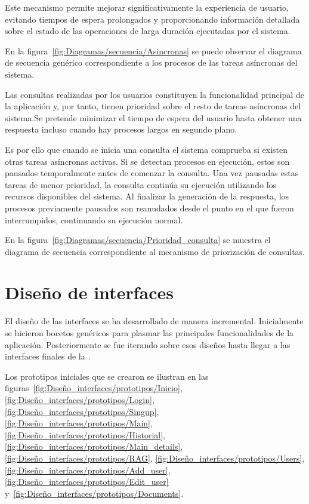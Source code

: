 Este mecanismo permite mejorar significativamente la experiencia de usuario, evitando tiempos de espera prolongados y proporcionando información detallada sobre el estado de las operaciones de larga duración ejecutadas por el sistema.

En la figura~\ref{fig:Diagramas/secuencia/Asincronas} se puede observar el diagrama de secuencia genérico correspondiente a los procesos de las tareas asíncronas del sistema.


Las consultas realizadas por los usuarios constituyen la funcionalidad principal de la aplicación y, por tanto, tienen prioridad sobre el resto de tareas asíncronas del sistema.Se pretende minimizar el tiempo de espera del usuario hasta obtener una respuesta incluso cuando hay procesos largos en segundo plano. 

Es por ello que cuando se inicia una consulta el sistema comprueba si existen otras tareas asíncronas activas. Si se detectan procesos en ejecución, estos son pausados temporalmente antes de comenzar la consulta. Una vez pausadas estas tareas de menor prioridad, la consulta continúa su ejecución utilizando los recursos disponibles del sistema. Al finalizar la generación de la respuesta, los procesos previamente pausados son reanudados desde el punto en el que fueron interrumpidos, continuando su ejecución normal.

En la figura~\ref{fig:Diagramas/secuencia/Prioridad_consulta} se muestra el diagrama de secuencia correspondiente al mecanismo de priorización de consultas.


\section{Diseño de interfaces} \label{dis:int}

El diseño de las interfaces se ha desarrollado de manera incremental. Inicialmente se hicieron bocetos genéricos para plasmar las principales funcionalidades de la aplicación. Posteriormente se fue iterando sobre esos diseños hasta llegar a las interfaces finales de la .

Los prototipos iniciales que se crearon se ilustran en las figuras~\ref{fig:Diseño_interfaces/prototipos/Inicio}, \ref{fig:Diseño_interfaces/prototipos/Login}, \ref{fig:Diseño_interfaces/prototipos/Singup}, \ref{fig:Diseño_interfaces/prototipos/Main}, \ref{fig:Diseño_interfaces/prototipos/Historial}, \ref{fig:Diseño_interfaces/prototipos/Main_details}, \ref{fig:Diseño_interfaces/prototipos/RAG}, \ref{fig:Diseño_interfaces/prototipos/Users}, \ref{fig:Diseño_interfaces/prototipos/Add_user}, \ref{fig:Diseño_interfaces/prototipos/Edit_user} y~\ref{fig:Diseño_interfaces/prototipos/Documents}.

